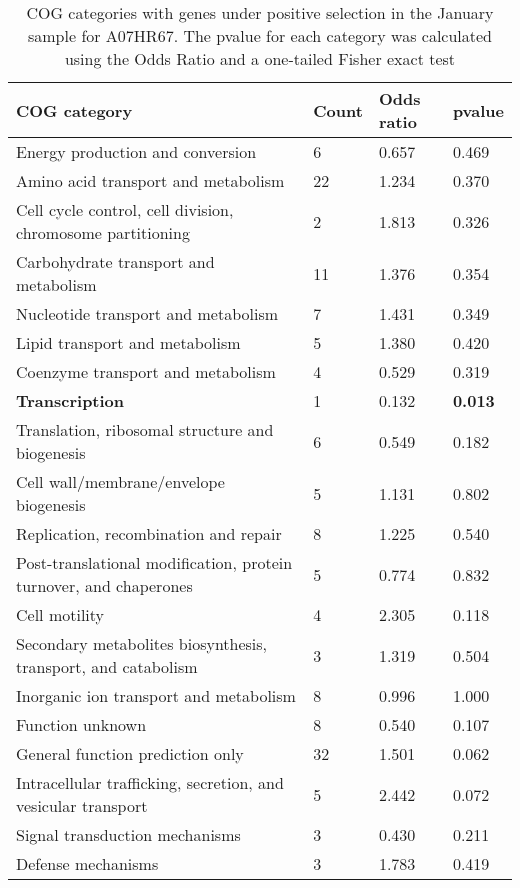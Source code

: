 \begin{table}[]
\footnotesize 
	\tabcolsep=0.11cm 
\caption{COG categories with genes under positive selection in the January sample for A07HR67. The pvalue for each category was calculated using the Odds Ratio and a one-tailed Fisher exact test \\} 
\begin{tabularx}{\textwidth}{L{6cm}R{2cm}R{2cm}R{2cm}} 
\hline 
\textbf{COG category} & \textbf{Count} & \textbf{Odds ratio} & \textbf{pvalue} \\ 
\hline 
Energy production and conversion & 6 & 0.657 & 0.469 \\ 
Amino acid transport and metabolism & 22 & 1.234 & 0.370 \\ 
Cell cycle control, cell division, chromosome partitioning & 2 & 1.813 & 0.326 \\ 
Carbohydrate transport and metabolism & 11 & 1.376 & 0.354 \\ 
Nucleotide transport and metabolism & 7 & 1.431 & 0.349 \\ 
Lipid transport and metabolism & 5 & 1.380 & 0.420 \\ 
Coenzyme transport and metabolism & 4 & 0.529 & 0.319 \\ 
\textbf{Transcription} & 1 & 0.132 & \textbf{0.013} \\ 
Translation, ribosomal structure and biogenesis & 6 & 0.549 & 0.182 \\ 
Cell wall/membrane/envelope biogenesis & 5 & 1.131 & 0.802 \\ 
Replication, recombination and repair & 8 & 1.225 & 0.540 \\ 
Post-translational modification, protein turnover, and chaperones & 5 & 0.774 & 0.832 \\ 
Cell motility & 4 & 2.305 & 0.118 \\ 
Secondary metabolites biosynthesis, transport, and catabolism & 3 & 1.319 & 0.504 \\ 
Inorganic ion transport and metabolism & 8 & 0.996 & 1.000 \\ 
Function unknown & 8 & 0.540 & 0.107 \\ 
General function prediction only & 32 & 1.501 & 0.062 \\ 
Intracellular trafficking, secretion, and vesicular transport & 5 & 2.442 & 0.072 \\ 
Signal transduction mechanisms & 3 & 0.430 & 0.211 \\ 
Defense mechanisms & 3 & 1.783 & 0.419 \\ 
\end{tabularx} 
\label{January_COG_Selection_A07HR67} 
 \end{table} 

